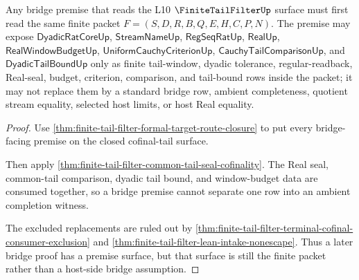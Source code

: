 \begin{theorem}
\label{thm:finite-tail-filter-bridge-premise-surface}
Any bridge premise that reads the L10 $\FiniteTailFilterUp$ surface must first read the same finite packet $F=(S,D,R,B,Q,E,H,C,P,N)$. The premise may expose $\mathsf{DyadicRatCoreUp}$, $\mathsf{StreamNameUp}$, $\mathsf{RegSeqRatUp}$, $\mathsf{RealUp}$, $\mathsf{RealWindowBudgetUp}$, $\mathsf{UniformCauchyCriterionUp}$, $\mathsf{CauchyTailComparisonUp}$, and $\mathsf{DyadicTailBoundUp}$ only as finite tail-window, dyadic tolerance, regular-readback, Real-seal, budget, criterion, comparison, and tail-bound rows inside the packet; it may not replace them by a standard bridge row, ambient completeness, quotient stream equality, selected host limits, or host Real equality.
\end{theorem}
\begin{proof}
Use \autoref{thm:finite-tail-filter-formal-target-route-closure} to put every bridge-facing premise on the closed cofinal-tail surface.

Then apply \autoref{thm:finite-tail-filter-common-tail-seal-cofinality}. The Real seal, common-tail comparison, dyadic tail bound, and window-budget data are consumed together, so a bridge premise cannot separate one row into an ambient completion witness.

The excluded replacements are ruled out by \autoref{thm:finite-tail-filter-terminal-cofinal-consumer-exclusion} and \autoref{thm:finite-tail-filter-lean-intake-nonescape}. Thus a later bridge proof has a premise surface, but that surface is still the finite packet rather than a host-side bridge assumption.
\end{proof}

